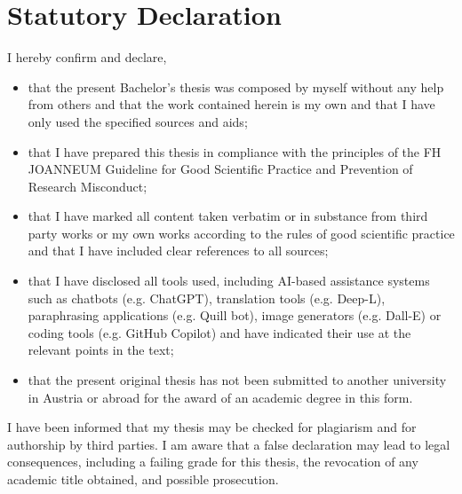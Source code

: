 \section*{Statutory Declaration}
I hereby confirm and declare,

\begin{itemize}
    \item that the present Bachelor's thesis was composed by myself without any help from others
          and that the work contained herein is my own and that I have only used the specified
          sources and aids;
    \item that I have prepared this thesis in compliance with the principles of the FH
          JOANNEUM Guideline for Good Scientific Practice and Prevention of Research Misconduct;
    \item  that I have marked all content taken verbatim or in substance from third party works or
          my own works according to the rules of good scientific practice and that I have included
          clear references to all sources;
    \item that I have disclosed all tools used, including AI-based assistance systems such as
          chatbots (e.g. ChatGPT), translation tools (e.g. Deep-L), paraphrasing applications (e.g.
          Quill bot), image generators (e.g. Dall-E) or coding tools (e.g. GitHub Copilot)
          and have indicated their use at the relevant points in the text;
    \item that the present original thesis has not been submitted to another university in Austria
          or abroad for the award of an academic degree in this form.
\end{itemize}

I have been informed that my thesis may be checked for plagiarism and for authorship by third
parties. I am aware that a false declaration may lead to legal consequences, including a failing
grade for this thesis, the revocation of any academic title obtained, and possible prosecution.
